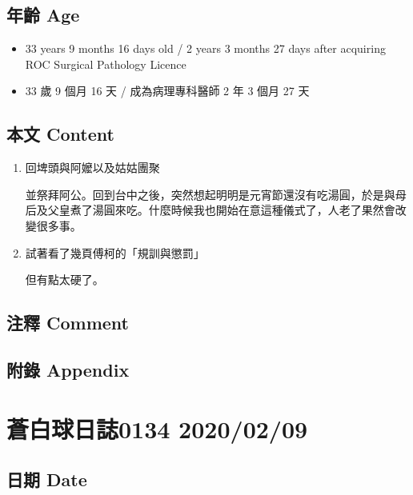 \documentclass[
]{article}
\providecommand{\tightlist}{%
  \setlength{\itemsep}{0pt}\setlength{\parskip}{0pt}}
\begin{document}
\hypertarget{ux5e74ux9f61-age-69}{%
\subsection{年齡 Age}\label{ux5e74ux9f61-age-69}}

\begin{itemize}
\tightlist
\item
  33 years 9 months 16 days old / 2 years 3 months 27 days after
  acquiring ROC Surgical Pathology Licence
\item
  33 歲 9 個月 16 天 / 成為病理專科醫師 2 年 3 個月 27 天
\end{itemize}

\hypertarget{ux672cux6587-content-69}{%
\subsection{本文 Content}\label{ux672cux6587-content-69}}

\begin{enumerate}
\def\labelenumi{\arabic{enumi}.}
\item
  回埤頭與阿嬤以及姑姑團聚

  並祭拜阿公。回到台中之後，突然想起明明是元宵節還沒有吃湯圓，於是與母后及父皇煮了湯圓來吃。什麼時候我也開始在意這種儀式了，人老了果然會改變很多事。
\item
  試著看了幾頁傅柯的「規訓與懲罰」

  但有點太硬了。
\end{enumerate}

\hypertarget{ux6ce8ux91cb-comment-68}{%
\subsection{注釋 Comment}\label{ux6ce8ux91cb-comment-68}}

\hypertarget{ux9644ux9304-appendix-69}{%
\subsection{附錄 Appendix}\label{ux9644ux9304-appendix-69}}

\hypertarget{ux84bcux767dux7403ux65e5ux8a8c0134-20200209}{%
\section{蒼白球日誌0134
2020/02/09}\label{ux84bcux767dux7403ux65e5ux8a8c0134-20200209}}

\hypertarget{ux65e5ux671f-date-70}{%
\subsection{日期 Date}\label{ux65e5ux671f-date-70}}
\end{document}
